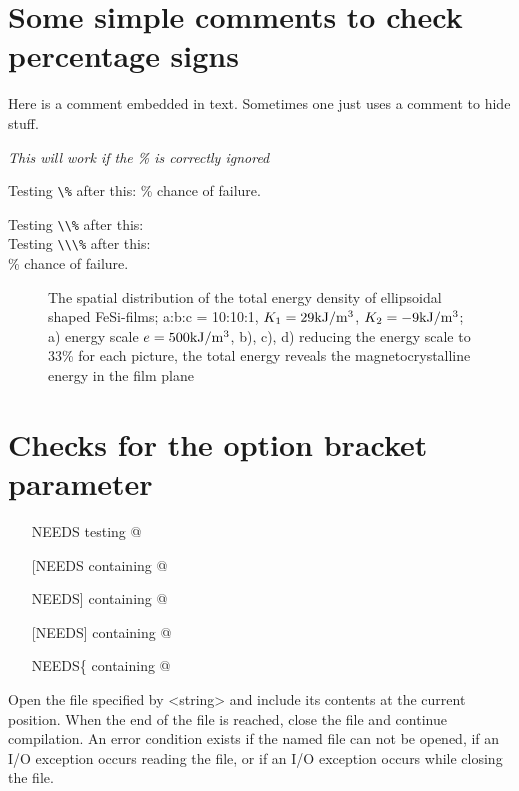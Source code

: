\documentclass{article}
\begin{document}
\section{Some simple comments to check percentage signs}
Here %
is a comment embedded in text.
Sometimes one just uses
a comment to hide stuff.

{\it This will work %
if the \% is correctly ignored}

Testing \verb#\%# after this: \% chance of failure.

Testing \verb#\\%# after this: \\%

Testing \verb#\\\%# after this: \\\% chance of failure.

\begin{figure}[ht]
\caption{\label{zoom}The spatial distribution of the total energy density of
ellipsoidal shaped FeSi-films; a:b:c = 10:10:1, $K_1 = 29\rm kJ/m^3$, $K_2 = -9 \rm kJ/m^3$;
a) energy scale $e = 500\rm kJ/m^3$,
b), c), d) reducing the energy scale to 33\% for each picture,
the total energy reveals the magnetocrystalline energy in the film
plane}
\end{figure}

\section{Checks for the option bracket parameter}

\begin{itemize}
\item [NEEDS] testing \verb@[NEEDS]@
\item [{[}NEEDS] containing \verb@[{[}NEEDS]@
\item [NEEDS{]}] containing \verb@[NEEDS{]}]@
\item [{[}NEEDS{]}] containing \verb@[{[}NEEDS{]}]@
\item [NEEDS\{] containing \verb@[NEEDS\{]@
\end{itemize}
Open the file specified by <string> and include its contents at the
current position. When the end of the file is reached, close the file
and continue compilation. An error condition exists if the named file
can not be opened, if an I/O exception occurs reading the file, or
if an I/O exception occurs while closing the file.\bigskip{}
\end{document}
